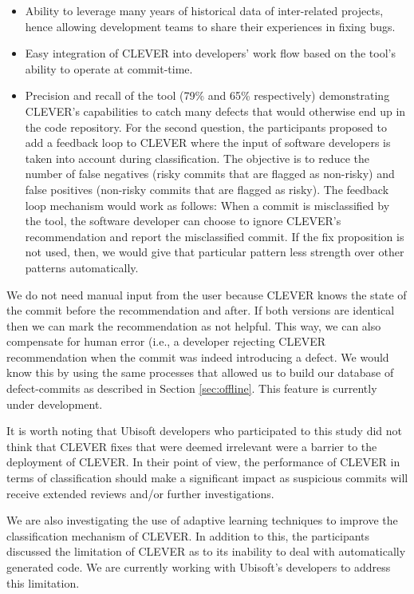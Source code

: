 \documentclass[12pt]{report}
\providecommand{\tightlist}{%
  \setlength{\itemsep}{0pt}\setlength{\parskip}{0pt}}
\begin{document}
\begin{itemize}
\tightlist
\item
  Ability to leverage many years of historical data of inter-related
  projects, hence allowing development teams to share their experiences
  in fixing bugs.
\item
  Easy integration of CLEVER into developers' work flow based on the
  tool's ability to operate at commit-time.\\
\item
  Precision and recall of the tool (79\% and 65\% respectively)
  demonstrating CLEVER's capabilities to catch many defects that would
  otherwise end up in the code repository. For the second question, the
  participants proposed to add a feedback loop to CLEVER where the input
  of software developers is taken into account during classification.
  The objective is to reduce the number of false negatives (risky
  commits that are flagged as non-risky) and false positives (non-risky
  commits that are flagged as risky). The feedback loop mechanism would
  work as follows: When a commit is misclassified by the tool, the
  software developer can choose to ignore CLEVER's recommendation and
  report the misclassified commit. If the fix proposition is not used,
  then, we would give that particular pattern less strength over other
  patterns automatically.
\end{itemize}

We do not need manual input from the user because CLEVER knows the state
of the commit before the recommendation and after. If both versions are
identical then we can mark the recommendation as not helpful. This way,
we can also compensate for human error (i.e., a developer rejecting
CLEVER recommendation when the commit was indeed introducing a defect.
We would know this by using the same processes that allowed us to build
our database of defect-commits as described in Section
\ref{sec:offline}. This feature is currently under development.

It is worth noting that Ubisoft developers who participated to this
study did not think that CLEVER fixes that were deemed irrelevant were a
barrier to the deployment of CLEVER. In their point of view, the
performance of CLEVER in terms of classification should make a
significant impact as suspicious commits will receive extended reviews
and/or further investigations.

We are also investigating the use of adaptive learning techniques to
improve the classification mechanism of CLEVER. In addition to this, the
participants discussed the limitation of CLEVER as to its inability to
deal with automatically generated code. We are currently working with
Ubisoft's developers to address this limitation.
\end{document}
